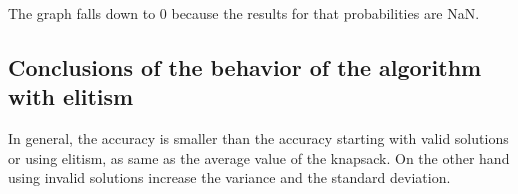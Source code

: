 \documentclass{article}
\begin{document}
    The graph falls down to 0 because the results for that probabilities are NaN.

    \subsection{Conclusions of the behavior of the algorithm with elitism}

    In general, the accuracy is smaller than the accuracy starting with valid solutions or using elitism, as same as the average value of
    the knapsack. On the other hand using invalid solutions increase the variance and the standard deviation.
\end{document}
